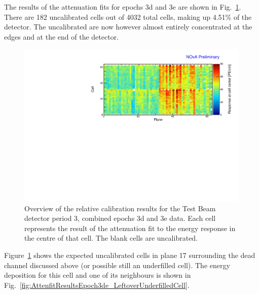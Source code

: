 The results of the attenuation fits for epochs 3d and 3e are shown in Fig.~\ref{fig:CellCentreResponseEp3de}. There are 182 uncalibrated cells out of 4032 total cells, making up 4.51\% of the detector. The uncalibrated are now however almost entirely concentrated at the edges and at the end of the detector.

\begin{figure}[!hbtp]
\centering
\includegraphics[width=\textwidth]{Plots/TBCalibration/CellResponseAtCentre_epoch3de_original_Limited_NOvAPlotStyle.pdf}
\caption[Map of fitted response at cell centre for epochs 3d and 3e data]{Overview of the relative calibration results for the Test Beam detector period 3, combined epochs 3d and 3e data. Each cell represents the result of the attenuation fit to the energy response in the centre of that cell. The blank cells are uncalibrated.}
\label{fig:CellCentreResponseEp3de}
\end{figure}

Figure~\ref{fig:CellCentreResponseEp3de} shows the expected uncalibrated cells in plane 17 surrounding the dead channel discussed above (or possible still an underfilled cell). The energy deposition for this cell and one of its neighbours is shown in Fig.~\ref{fig:AttenfitResultsEpoch3de_LeftoverUnderfilledCell}.

